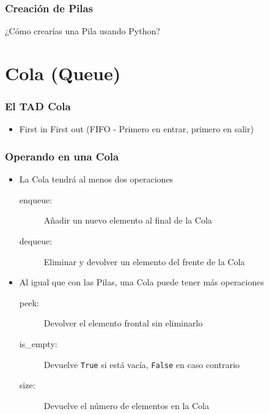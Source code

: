 \documentclass[11pt]{beamer}
\begin{document}
\begin{frame}\frametitle{Creación de Pilas}
\begin{block}{}
\centering\Huge ¿Cómo crearías una Pila usando Python?
\end{block}
\end{frame}


\section{Cola (Queue)}

\begin{frame}\frametitle{El TAD Cola}
\begin{itemize}
\item First in First out (FIFO - Primero en entrar, primero en salir)
\end{itemize}
\vspace{0.4cm}
\begin{center}
\end{center}
\end{frame}

\begin{frame}\frametitle{Operando en una Cola}
\begin{itemize}
\item La Cola tendrá al menos dos operaciones
    \begin{description}
    \item[enqueue:] Añadir un nuevo elemento al final de la Cola
    \item[dequeue:] Eliminar y devolver un elemento del frente de la Cola
    \end{description}
\item Al igual que con las Pilas, una Cola puede tener más operaciones
    \begin{description}
    \item[peek:] Devolver el elemento frontal sin eliminarlo
    \item[is\_empty:] Devuelve \lstinline|True| si está vacía, \lstinline|False| en caso contrario
    \item[size:] Devuelve el número de elementos en la Cola
    \end{description}
\end{itemize}
\end{frame}
\end{document}
